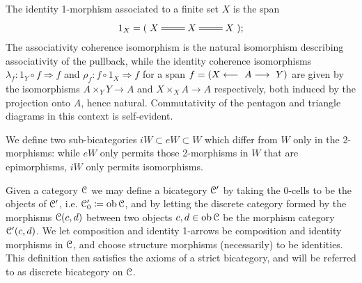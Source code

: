 \begin{defn}
      The identity 1-morphism associated to a finite set $X$ is the span %
      \begin{displaymath}
        1_X = (\xymatrix{ X & X \ar@{=}[l] \ar@{=}[r] & X});
      \end{displaymath}
      The associativity coherence isomorphism is the natural isomorphism describing associativity of the pullback, while the identity coherence isomorphisms $\lambda_f: 1_Y \circ f \Longrightarrow f$ and $\rho_f: f \circ 1_X \Longrightarrow f$ for a span $f=(X\longleftarrow~A\longrightarrow~Y)$ are given by the isomorphisms $A \times_Y Y \to A$ and $X \times_X A \to A$ respectively, both induced by the projection onto $A$, hence natural. Commutativity of the pentagon and triangle diagrams in this context is self-evident.
    \end{defn}

    \begin{defn}\label{def_subcategories_of_epimorphisms_and_isomorphisms}
      We define two sub-bicategories $iW \subset eW \subset W$ which differ from $W$ only in the 2-morphisms: while $eW$ only permits those 2-morphisms in $W$ that are epimorphisms, $iW$ only permits isomorphisms.
    \end{defn}


    \begin{rem}\label{rem_discrete_bicategory}
      Given a category $\mathcal{C}$ we may define a bicategory $\mathcal{C}^\prime$ by taking the 0-cells to be the objects of $\mathcal{C}^\prime$, i.e. $\mathcal{C}^\prime_0 \coloneqq \operatorname{ob} \mathcal{C}$, and by letting the discrete category formed by the morphisms $\mathcal{C}(c,d)$ between two objects $c,d \in \operatorname{ob} \mathcal{C}$ be the morphism category $\mathcal{C}^\prime(c,d)$. We let composition and identity 1-arrows be composition and identity morphisms in $\mathcal{C}$, and choose structure morphisms (necessarily) to be identities. This definition then satisfies the axioms of a strict bicategory, and will be referred to as discrete bicategory on $\mathcal{C}$.
    \end{rem}

